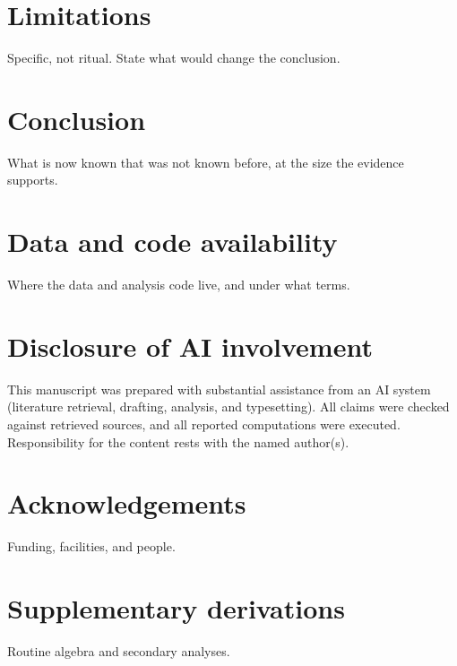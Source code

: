 \documentclass[11pt,a4paper]{article}
\begin{document}
\section{Limitations}
\label{sec:limitations}

Specific, not ritual. State what would change the conclusion.

\section{Conclusion}
\label{sec:conclusion}

What is now known that was not known before, at the size the evidence supports.

\section*{Data and code availability}
Where the data and analysis code live, and under what terms.

\section*{Disclosure of AI involvement}
This manuscript was prepared with substantial assistance from an AI system
(literature retrieval, drafting, analysis, and typesetting). All claims were
checked against retrieved sources, and all reported computations were executed.
Responsibility for the content rests with the named author(s).

\section*{Acknowledgements}
Funding, facilities, and people.



\appendix
\section{Supplementary derivations}
\label{app:derivations}

Routine algebra and secondary analyses.
\end{document}
